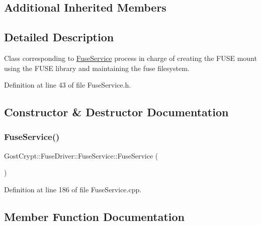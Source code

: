 \subsection*{Additional Inherited Members}


\subsection{Detailed Description}
Class corresponding to \hyperlink{class_gost_crypt_1_1_fuse_driver_1_1_fuse_service}{Fuse\+Service} process in charge of creating the F\+U\+SE mount using the F\+U\+SE library and maintaining the fuse filesystem. 

Definition at line 43 of file Fuse\+Service.\+h.



\subsection{Constructor \& Destructor Documentation}
\mbox{\label{class_gost_crypt_1_1_fuse_driver_1_1_fuse_service_a66af9d3e0da8336d6ba39f3c37eb8ffe}} 
\subsubsection{\texorpdfstring{Fuse\+Service()}{FuseService()}}
{\footnotesize\ttfamily Gost\+Crypt\+::\+Fuse\+Driver\+::\+Fuse\+Service\+::\+Fuse\+Service (\begin{DoxyParamCaption}{ }\end{DoxyParamCaption})}



Definition at line 186 of file Fuse\+Service.\+cpp.



\subsection{Member Function Documentation}
\mbox{\label{class_gost_crypt_1_1_fuse_driver_1_1_fuse_service_a070573d2fc37041d2359b24902366a0c}} 
